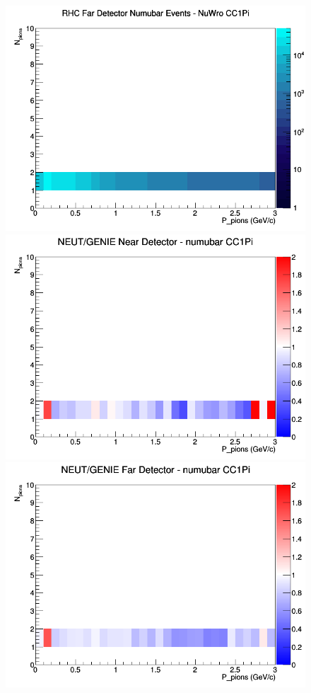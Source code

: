 \documentclass[12pt]{article}
\begin{document}
\begin{figure}[h]
\endminipage
{}
\includegraphics[width=\linewidth]{N_P/nominal/pions/CC1Pi_RHC_FD_numubar_N_P_NuWro.png}
\endminipage
\newline
{}
\includegraphics[width=\linewidth]{N_P/nominal/pions/ratios/CC1Pi_NEUT_GENIE_numubar_near_N_P.png}
\endminipage
{}
\includegraphics[width=\linewidth]{N_P/nominal/pions/ratios/CC1Pi_NEUT_GENIE_numubar_far_N_P.png}

\end{figure}
\end{document}
